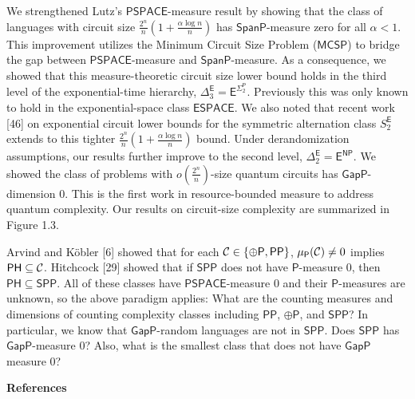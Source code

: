 \documentclass[10pt,a4paper]{article}
\begin{document}
We strengthened Lutz’s $\mathsf{PSPACE}$-measure result by showing that the class of languages with circuit size $\frac{2^{n}}{n}(1+\frac{\alpha\log n}{n})$ has $\mathsf{SpanP}$-measure zero for all $\alpha<1$. This improvement utilizes the Minimum Circuit Size Problem ($\mathsf{MCSP}$) to bridge the gap between $\mathsf{PSPACE}$-measure and $\mathsf{SpanP}$-measure. As a consequence, we showed that this measure-theoretic circuit size lower bound holds in the third level of the exponential-time hierarchy, $\Delta^{\mathsf{E}}_{3}=\mathsf{E}^{{\Sigma^{\mathsf{P}}_{2}}}$. Previously this was only known to hold in the exponential-space class $\mathsf{ESPACE}$. We also noted that recent work [46] on exponential circuit lower bounds for the symmetric alternation class $S^{\mathsf{E}}_{2}$ extends to this tighter $\frac{2^{n}}{n}(1+\frac{\alpha\log n}{n})$ bound. Under derandomization assumptions, our results further improve to the second level, $\Delta^{\mathsf{E}}_{2}=\mathsf{E}^{\mathsf{NP}}$. We showed the class of problems with $o\left(\frac{2^{n}}{n}\right)$-size quantum circuits has $\mathsf{GapP}$-dimension 0. This is the first work in resource-bounded measure to address quantum complexity.
Our results on circuit-size complexity are summarized in Figure 1.3.\par




Arvind and Köbler [6] showed that for
each ${\cal C}\in\{{\oplus\mathsf{P}},\mathsf{PP}\}$, $\mu_{\mathsf{P}}({\cal C})\not=0$ implies
$\mathsf{PH}\subseteq{\cal C}$. Hitchcock [29] showed that if $\mathsf{SPP}$ does not have $\mathsf{P}$-measure 0, then $\mathsf{PH}\subseteq\mathsf{SPP}$.
All of these classes have $\mathsf{PSPACE}$-measure 0 and their $\mathsf{P}$-measures are unknown, so the above paradigm applies:
What are the counting measures and dimensions of counting complexity classes including $\mathsf{PP}$, ${\oplus\mathsf{P}}$, and $\mathsf{SPP}$?
In particular, we know that $\mathsf{GapP}$-random languages are not in $\mathsf{SPP}$. Does $\mathsf{SPP}$ has $\mathsf{GapP}$-measure 0?
Also, what is the smallest class that does not have $\mathsf{GapP}$ measure 0?\par





\par\medskip\noindent\textbf{References}\par
\end{document}
